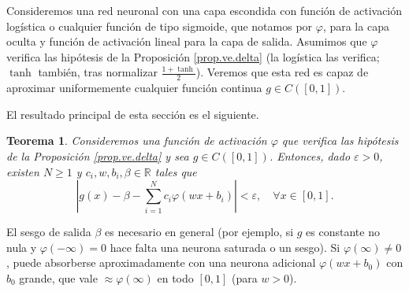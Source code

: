 \documentclass[12pt, a4paper]{amsbook}
\newcommand{\ve}{\varepsilon}
\newcommand{\R}{{\mathbb R}}
\newtheorem{teo}{Teorema}[section]
\theoremstyle{remark}
\theoremstyle{definition}
\numberwithin{section}{chapter}
\numberwithin{subsection}{section}
\numberwithin{equation}{section}
\numberwithin{figure}{chapter}
\begin{document}
Consideremos una red neuronal con una capa escondida con función de activación logística o cualquier función de tipo sigmoide, que notamos por $\varphi$, para la capa oculta y función de activación lineal para la capa de salida. Asumimos que $\varphi$ verifica las hipótesis de la Proposición \ref{prop.ve.delta} (la logística las verifica; $\tanh$ también, tras normalizar $\frac{1+\tanh}{2}$). Veremos que esta red es capaz de aproximar uniformemente cualquier función continua $g\in C([0, 1])$.

El resultado principal de esta sección es el siguiente.
\begin{teo}\label{teo.aprox.sigmoide}
Consideremos una función de activación $\varphi$ que verifica las hipótesis de la Proposición \ref{prop.ve.delta} y sea $g\in C([0, 1])$. Entonces, dado $\ve>0$, existen $N\ge 1$ y $c_i, w, b_i,\beta \in\R$ tales que
$$
\left| g(x) - \beta - \sum_{i=1}^N c_i\varphi(wx + b_i)\right| < \ve,\quad \forall x\in [0, 1].
$$
\end{teo}

El sesgo de salida $\beta$ es necesario en general (por ejemplo, si $g$ es constante no nula y $\varphi(-\infty)=0$ hace falta una neurona saturada o un sesgo). Si $\varphi(\infty)\neq0$, puede absorberse aproximadamente con una neurona adicional $\varphi(wx+b_0)$ con $b_0$ grande, que vale $\approx\varphi(\infty)$ en todo $[0,1]$ (para $w>0$).
\end{document}
